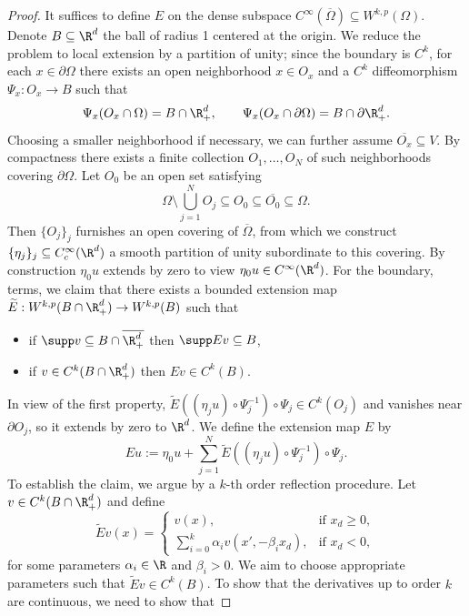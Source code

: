 \documentclass[reqno]{amsart}
\theoremstyle{definition}
\theoremstyle{remark}
\newcounter{problem}[section]	\declaretheorem[style=thmrecbox,name=Problem, numberlike=problem]{statement}
\begin{document}
\begin{proof}
	It suffices to define $E$ on the dense subspace $C^\infty (\overline \Omega) \subseteq W^{k, p} (\Omega)$. Denote $B \subseteq \R^d$ the ball of radius 1 centered at the origin. We reduce the problem to local extension by a partition of unity; since the boundary is $C^k$, for each $x \in \partial \Omega$ there exists an open neighborhood $x \in O_x$ and a $C^k$ diffeomorphism $\Psi_x : O_x \to B$ such that 
		\[ \Psi_x (O_x \cap \Omega)  = B \cap \R^d_+, \qquad \Psi_x (O_x \cap \partial\Omega)  = B \cap \partial\R^d_+. \]
	Choosing a smaller neighborhood if necessary, we can further assume $\overline{O_x} \subseteq V$. By compactness there exists a finite collection $O_1, \dots, O_N$ of such neighborhoods covering $\partial \Omega$. 	Let $O_0$ be an open set satisfying
		\[ \Omega \setminus \bigcup_{j = 1}^N O_j \subseteq O_0 \subseteq \overline{O_0} \subseteq \Omega.  \]
	Then $\{O_j\}_j$ furnishes an open covering of $\overline \Omega$, from which we construct $\{ \eta_j \}_j \subseteq C^\infty_c (\R^d)$ a smooth partition of unity subordinate to this covering. By construction $\eta_0 u$ extends by zero to view $\eta_0 u \in C^\infty (\R^d)$. For the boundary, terms, we claim that there exists a bounded extension map $\widetilde E: W^{k, p} (B \cap \R^d_+) \to W^{k, p} (B)$ such that
	\begin{itemize}
		\item if $\supp v \subseteq B \cap \overline{\R^d_+}$ then $\supp Ev \subseteq B$, 
		\item if $v \in C^k (B \cap \R^d_+)$ then $Ev \in C^k (B)$. 
	\end{itemize}
	In view of the first property, $\widetilde E((\eta_j u) \circ \Psi_j^{-1}) \circ \Psi_j \in C^k (O_j)$ and vanishes near $\partial O_j$, so it extends by zero to $\R^d$. We define the extension map $E$ by 
		\[ E u := \eta_0 u + \sum_{j = 1}^N \widetilde E((\eta_j u) \circ \Psi_j^{-1}) \circ \Psi_j. \]
	To establish the claim, we argue by a $k$-th order reflection procedure. Let $v \in C^k (B \cap \R^d_+)$ and define
		\[
			\widetilde E v (x)
				=
				\begin{cases}
					v(x) , 				&\text{if } x_d \geq 0, \\
					\sum_{i = 0}^k \alpha_i v (x', - \beta_i x_d) , 						&\text{if } x_d < 0,
				\end{cases}
		\]
	for some parameters $\alpha_i \in \R$ and $\beta_i > 0$. We aim to choose appropriate parameters such that $\widetilde E v \in C^k (B)$. To show that the derivatives up to order $k$ are continuous, we need to show that 

\end{proof}
\end{document}
